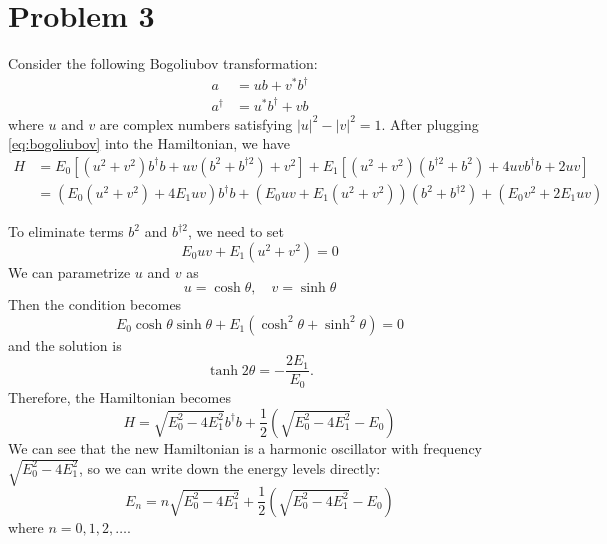\documentclass{article}
\begin{document}
\section*{Problem 3}
Consider the following Bogoliubov transformation:
\begin{subequations}\label{eq:bogoliubov}
    \begin{align}
        a&=ub+v^*b^\dagger\\
        a^\dagger&=u^*b^\dagger+vb
    \end{align}
\end{subequations}
where $u$ and $v$ are complex numbers satisfying $|u|^2-|v|^2=1$.
After plugging \cref{eq:bogoliubov} into the Hamiltonian, we have
\begin{equation}
    \begin{split}
        H&=E_0\left[(u^2+v^2)b^\dagger b+uv(b^2+b^{\dagger 2})+v^2\right]+E_1\left[(u^2+v^2)(b^{\dagger 2}+b^2)+4uvb^\dagger b+2uv\right]\\
         &= (E_0(u^2+v^2)+4E_1uv)b^\dagger b+(E_0uv+E_1(u^2+v^2))(b^2+b^{\dagger 2})+(E_0v^2+2E_1uv)
    \end{split}
\end{equation}

To eliminate terms $b^2$ and $b^{\dagger 2}$, we need to set
\begin{equation}
    E_0uv+E_1(u^2+v^2)=0
\end{equation}
We can parametrize $u$ and $v$ as
\begin{equation}
    u=\cosh\theta, \quad v=\sinh\theta
\end{equation}
Then the condition becomes
\begin{equation}
    E_0\cosh\theta\sinh\theta+E_1(\cosh^2\theta+\sinh^2\theta)=0
\end{equation}
and the solution is
\begin{equation}
    \tanh 2\theta=-\frac{2E_1}{E_0}.
\end{equation}
Therefore, the Hamiltonian becomes
\begin{equation}
    H=\sqrt{E_0^2-4E_1^2}b^\dagger b+\frac{1}{2}(\sqrt{E_0^2-4E_1^2}-E_0)
\end{equation}
We can see that the new Hamiltonian is a harmonic oscillator with frequency $\sqrt{E_0^2-4E_1^2}$, so we can write down the energy levels directly:
\begin{equation}
    E_n=n\sqrt{E_0^2-4E_1^2}+\frac{1}{2}(\sqrt{E_0^2-4E_1^2}-E_0)
\end{equation}
where $n=0,1,2,\ldots$.
\end{document}
